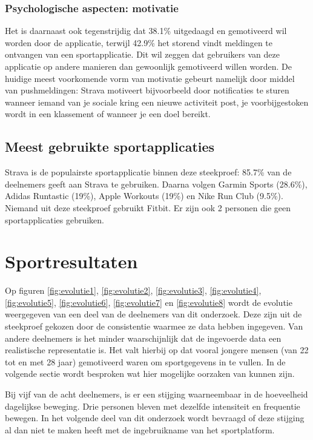 \subsubsection{Psychologische aspecten: motivatie}

Het is daarnaast ook tegenstrijdig dat 38.1\% uitgedaagd en gemotiveerd wil worden door de applicatie, terwijl 42.9\% het storend vindt meldingen te ontvangen van een sportapplicatie. Dit wil zeggen dat gebruikers van deze applicatie op andere manieren dan gewoonlijk gemotiveerd willen worden.
De huidige meest voorkomende vorm van motivatie gebeurt namelijk door middel van pushmeldingen:
Strava motiveert bijvoorbeeld door notificaties te sturen wanneer iemand van je sociale kring een nieuwe activiteit post, je voorbijgestoken wordt in een klassement of wanneer je een doel bereikt.

\subsection{Meest gebruikte sportapplicaties}

Strava is de populairste sportapplicatie binnen deze steekproef: 85.7\% van de deelnemers geeft aan Strava te gebruiken. Daarna volgen Garmin Sports (28.6\%), Adidas Runtastic (19\%), Apple Workouts (19\%) en Nike Run Club (9.5\%). Niemand uit deze steekproef gebruikt Fitbit. Er zijn ook 2 personen die geen sportapplicaties gebruiken.

\section{Sportresultaten}

Op figuren \ref{fig:evolutie1}, \ref{fig:evolutie2}, \ref{fig:evolutie3}, \ref{fig:evolutie4}, \ref{fig:evolutie5}, \ref{fig:evolutie6}, \ref{fig:evolutie7} en \ref{fig:evolutie8} wordt de evolutie weergegeven van een deel van de deelnemers van dit onderzoek. Deze zijn uit de steekproef gekozen door de consistentie waarmee ze data hebben ingegeven. Van andere deelnemers is het minder waarschijnlijk dat de ingevoerde data een realistische representatie is. Het valt hierbij op dat vooral jongere mensen (van 22 tot en met 28 jaar) gemotiveerd waren om sportgegevens in te vullen. In de volgende sectie wordt besproken wat hier mogelijke oorzaken van kunnen zijn.

Bij vijf van de acht deelnemers, is er een stijging waarneembaar in de hoeveelheid dagelijkse beweging. Drie personen bleven met dezelfde intensiteit en frequentie bewegen. In het volgende deel van dit onderzoek wordt bevraagd of deze stijging al dan niet te maken heeft met de ingebruikname van het sportplatform.

